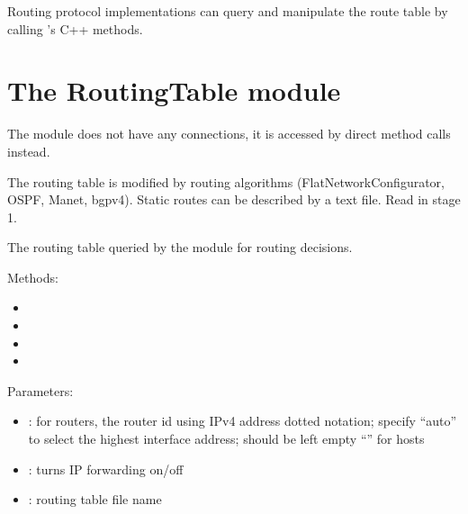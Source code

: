 Routing protocol implementations can query and manipulate the route table
by calling 's C++ methods.

% 
% 

\section{The RoutingTable module}

The  module does not have any connections,
it is accessed by direct method calls instead.

The routing table is modified by routing algorithms (FlatNetworkConfigurator, OSPF, Manet, bgpv4).
Static routes can be described by a text file. Read in stage 1.

The routing table queried by the  module for routing decisions.

Methods:

\begin{itemize}
  \item {}
  \item {}
  \item {}
  \item {}
\end{itemize}


Parameters:

\begin{itemize}
  \item {}: for routers, the router id using IPv4 address dotted notation;
        specify ``auto'' to select the highest interface address; should be left empty ``''
        for hosts
  \item {}: turns IP forwarding on/off
  \item {}: routing table file name
\end{itemize}

